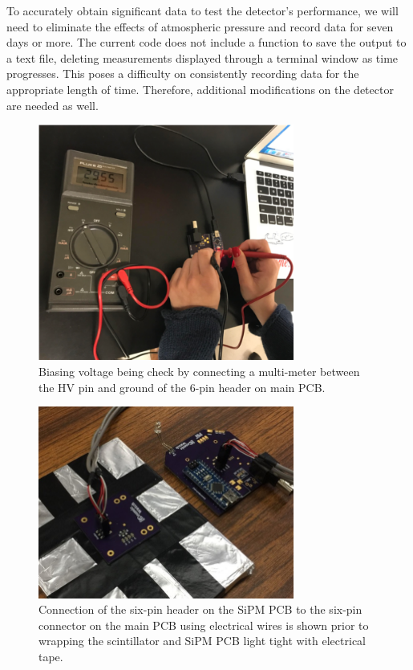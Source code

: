     To accurately obtain significant data to test the detector's performance, we will need to eliminate the effects of atmospheric pressure and record data for seven days or more. The current code does not include a function to save the output to a text file,  deleting measurements displayed through a terminal window as time progresses. This poses a difficulty on consistently recording data for the appropriate length of time.  Therefore, additional modifications on the detector are needed as well. 
\begin{figure}[htb]
\centering
\includegraphics[width=0.75\textwidth]{images/VoltageReading.png} 
\caption{Biasing voltage being check by connecting a multi-meter between the HV pin and ground of the 6-pin header on main PCB.}
\label{Bias Voltage check}
\end{figure}
\begin{figure}[htb]
\centering
\includegraphics[width=0.75\textwidth]{images/Connection_PCB.jpg} 
\caption{Connection of the six-pin header on the SiPM PCB to the six-pin connector on the main PCB using electrical wires is shown prior to wrapping the scintillator and SiPM PCB light tight with electrical tape.}
\end{figure}